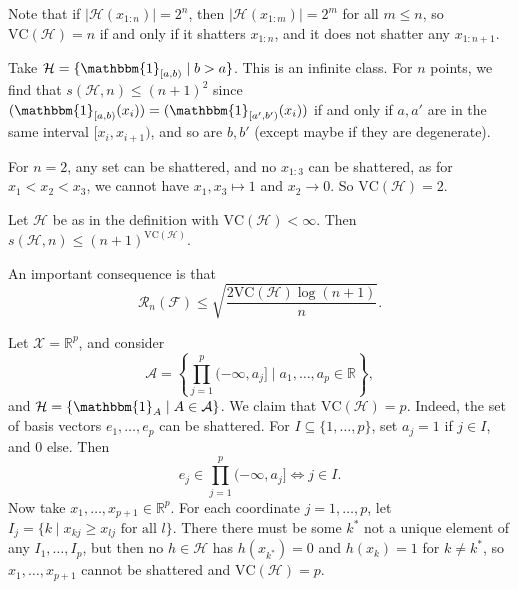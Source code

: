 \documentclass[12pt]{article}
\begin{document}
\begin{remark}
	Note that if $|\mathcal{H}(x_{1:n})| = 2^n$, then $|\mathcal{H}(x_{1:m})| = 2^m$ for all $m \leq n$, so $\mathrm{VC}(\mathcal{H}) = n$ if and only if it shatters $x_{1:n}$, and it does not shatter any $x_{1:n+1}$.
\end{remark}

\begin{exbox}
	Take $\mathcal{H} = \{\mathbbm{1}_{[a, b)} \mid b > a\}$. This is an infinite class. For $n$ points, we find that $s(\mathcal{H}, n) \leq (n+1)^2$ since $(\mathbbm{1}_{[a,b)}(x_i)) = (\mathbbm{1}_{[a', b')}(x_i))$ if and only if $a, a'$ are in the same interval $[x_i, x_{i+1})$, and so are $b, b'$ (except maybe if they are degenerate).

	For $n = 2$, any set can be shattered, and no $x_{1:3}$ can be shattered, as for $x_1 < x_2 < x_3$, we cannot have $x_1, x_3 \mapsto 1$ and $x_2 \to 0$. So $\mathrm{VC}(\mathcal{H}) = 2$.
\end{exbox}

\begin{lemma}
	Let $\mathcal{H}$ be as in the definition with $\mathrm{VC}(\mathcal{H}) < \infty$. Then $s(\mathcal{H}, n) \leq (n+1)^{\mathrm{VC}(\mathcal{H})}$.
\end{lemma}

An important consequence is that
\[
	\mathcal{R}_n(\mathcal{F}) \leq \sqrt{\frac{2 \mathrm{VC}(\mathcal{H}) \log(n+1)}{n}}.
\]

\begin{exbox}
	Let $\mathcal{X} = \mathbb{R}^p$, and consider
	\[
		\mathcal{A} = \left\{ \prod_{j = 1}^p (-\infty, a_j] \mid a_1, \ldots, a_p \in \mathbb{R}\right\},
	\]
	and $\mathcal{H} = \{\mathbbm{1}_{A} \mid A \in \mathcal{A}\}$. We claim that $\mathrm{VC}(\mathcal{H}) = p$. Indeed, the set of basis vectors $e_1, \ldots, e_p$ can be shattered. For $I \subseteq \{1, \ldots, p\}$, set $a_j = 1$ if $j \in I$, and $0$ else. Then
	\[
		e_j \in \prod_{j = 1}^p (-\infty, a_j] \iff j \in I.
	\]
	Now take $x_1, \ldots, x_{p+1} \in \mathbb{R}^p$. For each coordinate $j = 1, \ldots, p$, let $I_j = \{k \mid x_{kj} \geq x_{lj} \text{ for all } l\}$. There there must be some $k^\ast$ not a unique element of any $I_1, \ldots, I_p$, but then no $h \in \mathcal{H}$ has $h(x_{k^\ast}) = 0$ and $h(x_k) = 1$ for $k \neq k^\ast$, so $x_1, \ldots, x_{p+1}$ cannot be shattered and $\mathrm{VC}(\mathcal{H}) = p$.
\end{exbox}
\end{document}
